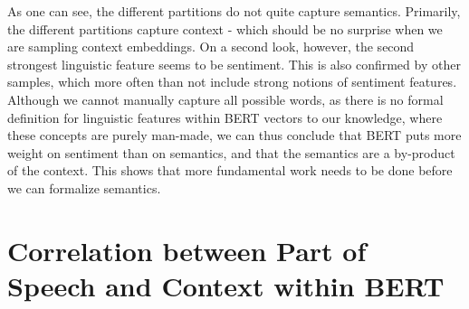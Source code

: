 \documentclass[a4paper,12pt,twoside,openright]{report}
\begin{document}
\label{fig:example_arms_negative_crossed}


As one can see, the different partitions do not quite capture semantics.
Primarily, the different partitions capture context - which should be no surprise when we are sampling context embeddings.
On a second look, however, the second strongest linguistic feature seems to be sentiment. 
This is also confirmed by other samples, which more often than not include strong notions of sentiment features.
Although we cannot manually capture all possible words, as there is no formal definition for linguistic features within BERT vectors to our knowledge, where these concepts are purely man-made, 
we can thus conclude that BERT puts more weight on sentiment than on semantics, and that the semantics are a by-product of the context.
This shows that more fundamental work needs to be done before we can formalize semantics.


\section{Correlation between Part of Speech and Context within BERT} \label{correlation_pos_context}
\end{document}
